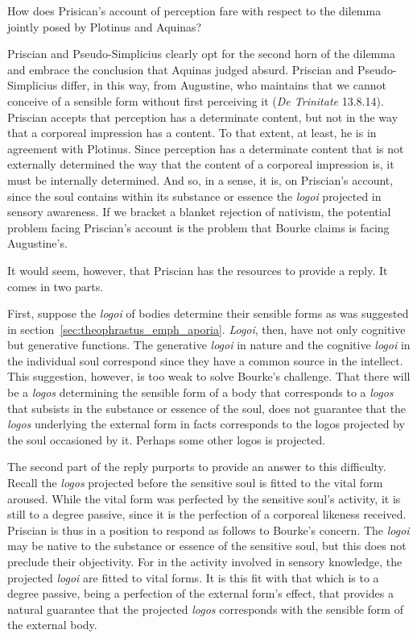 \documentclass[12pt]{article}
\begin{document}
How does Prisican's account of perception fare with respect to the dilemma jointly posed by Plotinus and Aquinas?

Priscian and Pseudo-Simplicius clearly opt for the second horn of the dilemma and embrace the conclusion that Aquinas judged absurd. Priscian and Pseudo-Simplicius differ, in this way, from Augustine, who maintains that we cannot conceive of a sensible form without first perceiving it (\emph{De Trinitate} 13.8.14). Priscian accepts that perception has a determinate content, but not in the way that a corporeal impression has a content. To that extent, at least, he is in agreement with Plotinus. Since perception has a determinate content that is not externally determined the way that the content of a corporeal impression is, it must be internally determined. And so, in a sense, it is, on Priscian's account, since the soul contains within its substance or essence the \emph{logoi} projected in sensory awareness. If we bracket a blanket rejection of nativism, the potential problem facing Priscian's account is the problem that Bourke claims is facing Augustine's.

It would seem, however, that Priscian has the resources to provide a reply. It comes in two parts.

First, suppose the \emph{logoi} of bodies determine their sensible forms as was suggested in section~\ref{sec:theophrastus_emph_aporia}. \emph{Logoi}, then, have not only cognitive but generative functions. The generative \emph{logoi} in nature and the cognitive \emph{logoi} in the individual soul correspond since they have a common source in the intellect. This suggestion, however, is too weak to solve Bourke's challenge. That there will be a \emph{logos} determining the sensible form of a body that corresponds to a \emph{logos} that subsists in the substance or essence of the soul, does not guarantee that the \emph{logos} underlying the external form in facts corresponds to the logos projected by the soul occasioned by it. Perhaps some other logos is projected.

The second part of the reply purports to provide an answer to this difficulty. Recall the \emph{logos} projected before the sensitive soul is fitted to the vital form aroused. While the vital form was perfected by the sensitive soul's activity, it is still to a degree passive, since it is the perfection of a corporeal likeness received. Priscian is thus in a position to respond as follows to Bourke's concern. The \emph{logoi} may be native to the substance or essence of the sensitive soul, but this does not preclude their objectivity. For in the activity involved in sensory knowledge, the projected \emph{logoi} are fitted to vital forms. It is this fit with that which is to a degree passive, being a perfection of the external form's effect, that provides a natural guarantee that the projected \emph{logos} corresponds with the sensible form of the external body.
\end{document}
